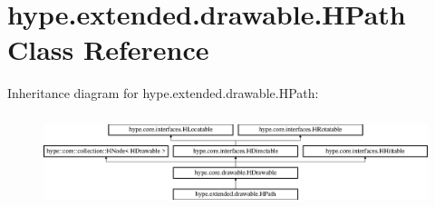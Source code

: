 \hypertarget{classhype_1_1extended_1_1drawable_1_1_h_path}{\section{hype.\-extended.\-drawable.\-H\-Path Class Reference}
\label{classhype_1_1extended_1_1drawable_1_1_h_path}
}
Inheritance diagram for hype.\-extended.\-drawable.\-H\-Path\-:\begin{figure}[H]
\begin{center}
\leavevmode
\includegraphics[height=2.745098cm]{classhype_1_1extended_1_1drawable_1_1_h_path}
\end{center}
\end{figure}
